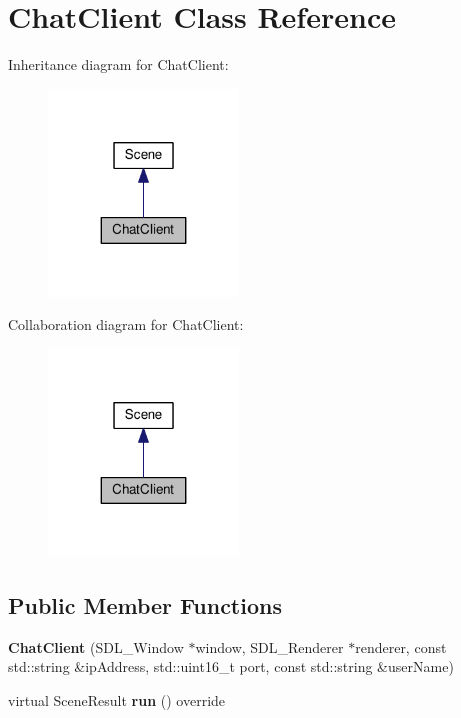 \hypertarget{classChatClient}{}\section{Chat\+Client Class Reference}
\label{classChatClient}


Inheritance diagram for Chat\+Client\+:\nopagebreak
\begin{figure}[H]
\begin{center}
\leavevmode
\includegraphics[width=143pt]{classChatClient__inherit__graph}
\end{center}
\end{figure}


Collaboration diagram for Chat\+Client\+:\nopagebreak
\begin{figure}[H]
\begin{center}
\leavevmode
\includegraphics[width=143pt]{classChatClient__coll__graph}
\end{center}
\end{figure}
\subsection*{Public Member Functions}
\begin{DoxyCompactItemize}
\item 
{\bfseries Chat\+Client} (S\+D\+L\+\_\+\+Window $\ast$window, S\+D\+L\+\_\+\+Renderer $\ast$renderer, const std\+::string \&ip\+Address, std\+::uint16\+\_\+t port, const std\+::string \&user\+Name)\hypertarget{classChatClient_ad67333067769e75bbfdbf01c72a0d6c8}{}\label{classChatClient_ad67333067769e75bbfdbf01c72a0d6c8}

\item 
virtual Scene\+Result {\bfseries run} () override\hypertarget{classChatClient_acea2119ab2d1547fa64f481652585533}{}\label{classChatClient_acea2119ab2d1547fa64f481652585533}

\end{DoxyCompactItemize}
